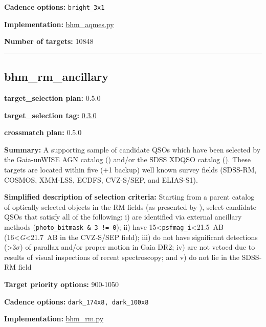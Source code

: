 \noindent\textbf{Cadence options:} \texttt{bright\_3x1}

\noindent\textbf{Implementation:}
\href{https://github.com/sdss/target_selection/blob/0.3.5/python/target_selection/cartons/bhm_aqmes.py}{bhm\_aqmes.py}

\noindent\textbf{Number of targets:} 10848

\begin{center}\rule{0.5\linewidth}{0.5pt}\end{center}

\hypertarget{bhm_rm_ancillary_plan0.5.0}{%
\subsection{bhm\_rm\_ancillary}\label{bhm_rm_ancillary_plan0.5.0}}

\noindent\textbf{target\_selection plan:} 0.5.0

\noindent\textbf{target\_selection tag:}
\href{https://github.com/sdss/target_selection/tree/0.3.0/}{0.3.0}

\noindent\textbf{crossmatch plan:} 0.5.0

\noindent\textbf{Summary:} A supporting sample of candidate QSOs which have been
selected by the Gaia-unWISE AGN catalog
(\citealt{Shu2019}) and/or the SDSS XDQSO catalog
(\citealt{Bovy2011}). These targets are located within five (+1 backup) well
known survey fields (SDSS-RM, COSMOS, XMM-LSS, ECDFS, CVZ-S/SEP, and
ELIAS-S1).

\noindent\textbf{Simplified description of selection criteria:} Starting from a
parent catalog of optically selected objects in the RM fields (as
presented by
\citealt{Yang2022}), select candidate QSOs that satisfy all of the
following: i) are identified via external ancillary methods
(\texttt{photo\_bitmask\ \&\ 3\ !=\ 0}); ii) have
15\textless{}\texttt{psfmag\_i}\textless21.5~AB
(16\textless{}\emph{G}\textless21.7~AB in the CVZ-S/SEP field); iii) do
not have significant detections (\textgreater3$\sigma$) of parallax and/or
proper motion in Gaia DR2; iv) are not vetoed due to results of visual
inspections of recent spectroscopy; and v) do not lie in the SDSS-RM
field


\noindent\textbf{Target priority options:} 900-1050

\noindent\textbf{Cadence options:} \texttt{dark\_174x8,\ dark\_100x8}

\noindent\textbf{Implementation:}
\href{https://github.com/sdss/target_selection/blob/0.3.0/python/target_selection/cartons/bhm_rm.py}{bhm\_rm.py}

